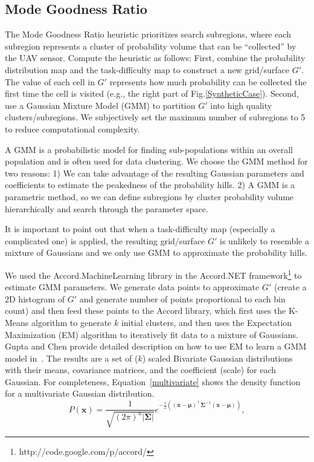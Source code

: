 \subsection{Mode Goodness Ratio}

The Mode Goodness Ratio heuristic prioritizes search subregions, where each subregion represents a cluster of probability volume that can be ``collected'' by the UAV sensor. Compute the heuristic as follows: First, combine the probability distribution map and the task-difficulty map to construct a new grid/surface $G'$. The value of each cell in $G'$ represents how much probability can be collected the first time the cell is visited (e.g., the right part of Fig.\ref{SyntheticCase}). Second, use a Gaussian Mixture Model (GMM) to partition $G'$ into high quality clusters/subregions. We subjectively set the maximum number of subregions to 5 to reduce computational complexity.

A GMM is a probabilistic model for finding sub-populations within an overall population and is often used for data clustering. We choose the GMM method for two reasons: 1) We can take advantage of the resulting Gaussian parameters and coefficients to estimate the peakedness of the probability hills. 2) A GMM is a parametric method, so we can define subregions by cluster probability volume hierarchically and search through the parameter space.

It is important to point out that when a task-difficulty map (especially a complicated one) is applied, the resulting grid/surface $G'$ is unlikely to resemble a mixture of Gaussians and we only use GMM to approximate the probability hills.

We used the Accord.MachineLearning library in the Accord.NET framework\footnote{http://code.google.com/p/accord/} to estimate GMM parameters. We generate data points to approximate $G'$ (create a 2D histogram of $G'$ and generate number of points proportional to each bin count) and then feed these points to the Accord library, which first uses the K-Means algorithm to generate $k$ initial clusters, and then uses the Expectation Maximization (EM) algorithm to iteratively fit data to a mixture of Gaussians. Gupta and Chen provide detailed description on how to use EM to learn a GMM model in~\cite{Gupta2011Theory}. The results are a set of ($k$) scaled Bivariate Gaussian distributions with their means, covariance matrices, and the coefficient (scale) for each Gaussian. For completeness, Equation~\ref{multivariate} shows the density function for a multivariate Gaussian distribution.
\begin{equation}
P(\mathbf{x}) = \frac{1}{\sqrt{(2\pi)^n|\mathbf{\Sigma}|}} e^{-\frac{1}{2}\left( (\mathbf{x}-\mathbf{\mu})^{\top}\mathbf{\Sigma}^{-1} (\mathbf{x}-\mathbf{\mu}) \right)} ,
\label{multivariate}
\end{equation}

